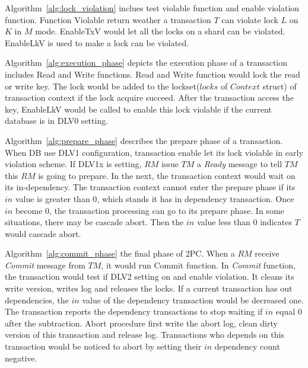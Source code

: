 \documentclass[conference]{IEEEtran}
\begin{document}
Algorithm~\ref{alg:lock_violation} inclues test violable function and enable violation function.
Function Violable return weather a transaction ${T}$ can violate lock ${L}$ on ${K}$ in ${M}$ mode.
EnableTxV would let all the locks on a shard can be violated.
EnableLkV is used to make a lock can be violated.

Algorithm~\ref{alg:execution_phase} depicts the execution phase of a transaction includes Read and Write functions.
Read and Write function would lock the read or write key.
The lock would be added to the lockset(${locks}$ of ${Context}$ struct) of transaction context
if the lock acquire succeed.
After the transaction access the key,
EnableLkV would be called to enable this lock violable if the current database is in DLV0 setting. 

Algorithm~\ref{alg:prepare_phase} describes the prepare phase of a transaction.
When DB use DLV1 configuration, 
transaction enable let its lock violable in early violation scheme.
If DLV1x is setting, ${RM}$ issue ${TM}$ a \emph{Ready} message to tell ${TM}$ this ${RM}$ is going to prepare.
In the next, the transaction context would wait on its in-dependency.
The transaction context cannot enter the prepare phase if its ${in}$ value is greater than 0, which stands it has in dependency transaction.
Once ${in}$ become 0, the transaction processing can go to its prepare phase.
In some situations, there may be cascade abort.
Then the ${in}$ value less than 0 indicates ${T}$ would cascade abort. 


Algorithm~\ref{alg:commit_phase} the final phase of 2PC.
When a ${RM}$ receive \emph{Commit} message from ${TM}$, it would run Commit function.
In \emph{Commit} function, the transaction would test if DLV2 setting on and enable violation.
It cleans its write version, writes log and releases the locks.
If a current transaction has out dependencies, the ${in}$ value of the dependency transaction would be decreased one.
The transaction reports the dependency transactions to stop waiting if $in$ equal 0 after the subtraction.  
Abort procedure first write the abort log, clean dirty version of this transaction and release log.
Transactions who depends on this transaction would be noticed to abort by setting their ${in}$ dependency count negative.
\end{document}
